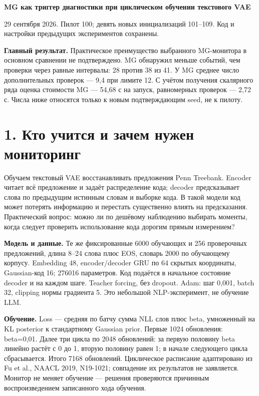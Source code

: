 \documentclass[10pt,a4paper]{article}
\begin{document}
{\Large\bfseries MG как триггер диагностики при циклическом обучении текстового VAE}\par\medskip

29 сентября 2026. Пилот 100; девять новых инициализаций 101--109. Код и настройки предыдущих экспериментов сохранены.

\textbf{Главный результат.} Практическое преимущество выбранного MG-монитора в основном сравнении не подтверждено. MG обнаружил меньше событий, чем проверки через равные интервалы: 28 против 38 из 41. У MG среднее число дополнительных проверок --- 9,4 при лимите 12. С учётом получения скалярного ряда оценка стоимости MG --- 54,68 с на запуск, равномерных проверок --- 2,72 с. Числа ниже относятся только к новым подтверждающим seed, не к пилоту.

\section*{1. Кто учится и зачем нужен мониторинг}

Обучаем текстовый VAE восстанавливать предложения Penn Treebank. Encoder читает всё предложение и задаёт распределение кода; decoder предсказывает слова по предыдущим истинным словам и выборке кода. В такой модели код может потерять информацию и перестать существенно влиять на предсказания. Практический вопрос: можно ли по дешёвому наблюдению выбирать моменты, когда следует проверить использование кода дорогим прямым измерением?

\textbf{Модель и данные.} Те же фиксированные 6000 обучающих и 256 проверочных предложений, длина 8--24 слова плюс EOS, словарь 2000 по обучающему корпусу. Embedding 48, encoder/decoder GRU по 64 скрытых координаты, Gaussian-код 16; 276016 параметров. Код подаётся в начальное состояние decoder и на каждом шаге. Teacher forcing, без dropout. Adam: шаг 0,001, batch 32, clipping нормы градиента 5. Это небольшой NLP-эксперимент, не обучение LLM.

\textbf{Обучение.} Loss --- средняя по батчу сумма NLL слов плюс beta, умноженный на KL posterior к стандартному Gaussian prior. Первые 1024 обновления: beta=0,01. Далее три цикла по 2048 обновлений: за первую половину beta линейно растёт с 0 до 1, вторую половину равен 1; в начале следующего цикла сбрасывается. Итого 7168 обновлений. Циклическое расписание адаптировано из Fu et al., NAACL 2019, N19-1021; совпадение их результатов не заявляется. Монитор не меняет обучение --- решения проверяются причинным воспроизведением записанного хода обучения.
\end{document}
